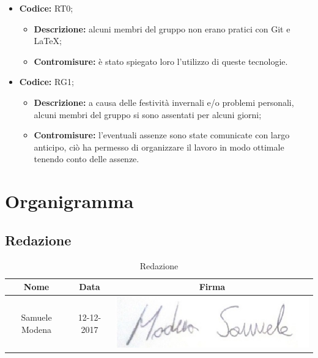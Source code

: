\documentclass[./PianodiProgetto.tex]{subfiles}
\begin{document}
\begin{itemize}
	\item \textbf{Codice:} RT0;
	\begin{itemize}
		\item \textbf{Descrizione:} alcuni membri del gruppo non erano pratici con Git e \LaTeX;
		\item \textbf{Contromisure:} è stato spiegato loro l'utilizzo di queste tecnologie.
	\end{itemize} 
	\item \textbf{Codice:} RG1;
	\begin{itemize}
		\item \textbf{Descrizione:} a causa delle festività invernali e/o problemi personali, alcuni membri del gruppo si sono assentati per alcuni giorni;
		\item \textbf{Contromisure:} l'eventuali assenze sono state comunicate con largo anticipo, ciò ha permesso di organizzare il lavoro in modo ottimale tenendo conto delle assenze.
	\end{itemize} 
\end{itemize}

\chapter{Organigramma}

\section{Redazione}
\begin{table}[H]
	\centering
	\begin{tabular}{|c|c|c|}
		\hline
		Nome&Data&Firma \\ \hline
		Samuele Modena& 12-12-2017 &\includegraphics[scale=0.5]{img/firme/ModenaSamuele} \\
		\hline
	\end{tabular}
	\caption{Redazione}
\end{table}
\end{document}
